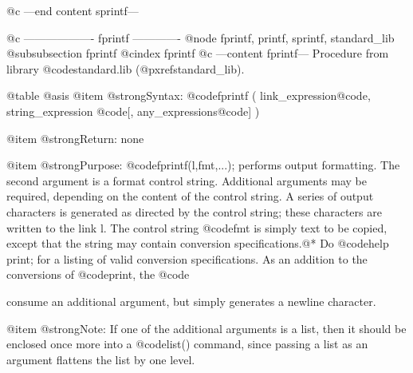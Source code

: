 {@c ---end content sprintf---

@c ------------------- fprintf -------------
@node fprintf, printf, sprintf, standard_lib
@subsubsection fprintf
@cindex fprintf
@c ---content fprintf---
Procedure from library @code{standard.lib} (@pxref{standard_lib}).

@table @asis
@item @strong{Syntax:}
@code{fprintf (} link_expression@code{,} string_expression @code{[,}
any_expressions@code{] )}

@item @strong{Return:}
none

@item @strong{Purpose:}
@code{fprintf(l,fmt,...);} performs output formatting.
The second argument is a format control string. Additional
arguments may be required, depending on the content of the
control string. A series of output characters is generated as
directed by the control string; these characters are
written to the link l.
The control string @code{fmt} is simply text to be copied, except
that the string may contain conversion specifications.@*
Do @code{help print;} for a listing of valid conversion
specifications. As an addition to the conversions of @code{print},
the @code{%
consume an additional argument, but simply generates a newline
character.

@item @strong{Note:}
If one of the additional arguments is a list, then it should be
enclosed once more into a @code{list()} command, since passing
a list as an argument flattens the list by one level.

}}
